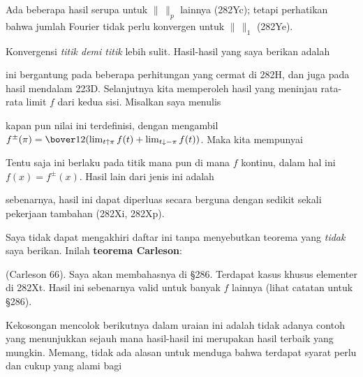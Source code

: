 {

\noindent Ada beberapa hasil serupa untuk $\|\,\|_p$ lainnya (282Yc);
tetapi perhatikan bahwa jumlah Fourier tidak perlu konvergen untuk $\|\,\|_1$ (282Ye).

Konvergensi {\it titik demi titik} lebih sulit.   Hasil-hasil yang saya berikan adalah


\noindent ini bergantung pada beberapa perhitungan yang cermat di 282H, dan juga pada
hasil mendalam 223D.   Selanjutnya kita memperoleh hasil yang meninjau rata-rata
limit $f$ dari kedua sisi.   Misalkan saya menulis


\noindent kapan pun nilai ini terdefinisi, dengan mengambil $f^{\pm}(\pi)
=\bover12(\lim_{t\uparrow\pi}f(t)+\lim_{t\downarrow-\pi}f(t))$.   Maka
kita mempunyai



\noindent Tentu saja ini berlaku pada titik mana pun di mana $f$ kontinu,
dalam hal ini $f(x)=f^{\pm}(x)$.
Hasil lain dari jenis ini adalah


\noindent sebenarnya, hasil ini dapat diperluas secara berguna dengan sedikit sekali pekerjaan tambahan
(282Xi, 282Xp).

Saya tidak dapat mengakhiri daftar ini tanpa menyebutkan teorema yang {\it tidak} saya berikan.   Inilah {\bf teorema Carleson}:


\noindent ({\smc Carleson 66}).   Saya akan membahasnya di \S286.   Terdapat
kasus khusus elementer di 282Xt.   Hasil ini sebenarnya
valid untuk banyak $f$ lainnya (lihat catatan untuk \S286).

Kekosongan mencolok berikutnya dalam uraian ini adalah tidak adanya contoh
yang menunjukkan sejauh mana hasil-hasil ini merupakan hasil terbaik yang mungkin.   Memang, tidak ada alasan untuk menduga
bahwa terdapat syarat perlu dan cukup
yang alami bagi

}

